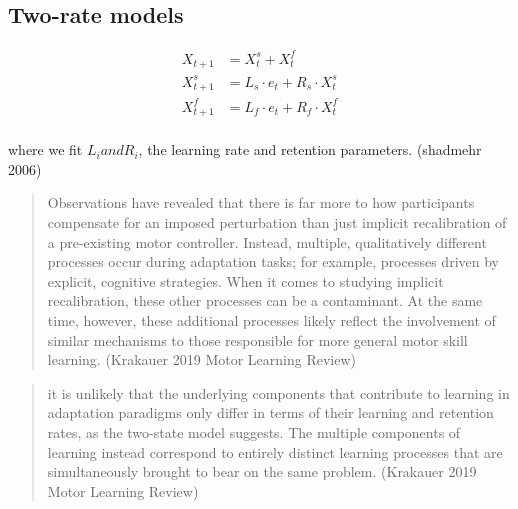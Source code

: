 \documentclass[../main.tex]{subfiles}
\begin{document}
\subsection{Two-rate models}\label{two-rate-models}

\[
\begin{aligned}
X_{t+1} &= X^{s}_{t} + X^f_t \\
X^s_{t+1} &= L_s \cdot e_t + R_s \cdot X^s_{t} \\
X^f_{t+1} &= L_f \cdot e_t + R_f \cdot X^f_{t} \\
\end{aligned}
\]

where we fit \(L_i and R_i\), the learning rate and retention
parameters. (shadmehr 2006)

\begin{quote}
Observations have revealed that there is far more to how participants
compensate for an imposed perturbation than just implicit recalibration
of a pre-existing motor controller. Instead, multiple, qualitatively
different processes occur during adaptation tasks; for example,
processes driven by explicit, cognitive strategies. When it comes to
studying implicit recalibration, these other processes can be a
contaminant. At the same time, however, these additional processes
likely reflect the involvement of similar mechanisms to those
responsible for more general motor skill learning. (Krakauer 2019 Motor
Learning Review)
\end{quote}

\begin{quote}
it is unlikely that the underlying components that contribute to
learning in adaptation paradigms only differ in terms of their learning
and retention rates, as the two-state model suggests. The multiple
components of learning instead correspond to entirely distinct learning
processes that are simultaneously brought to bear on the same problem.
(Krakauer 2019 Motor Learning Review)
\end{quote}

\end{document}
